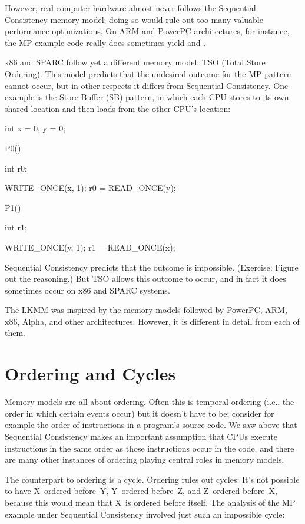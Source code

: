 However, real computer hardware almost never follows the Sequential
Consistency memory model; doing so would rule out too many valuable
performance optimizations.
On ARM and PowerPC architectures, for instance, the MP example code
really does sometimes yield  and .

x86 and SPARC follow yet a different memory model:
TSO (Total Store Ordering).
This model predicts that the undesired outcome for the MP pattern
cannot occur, but in other respects it differs from Sequential
Consistency.
One example is the Store Buffer (SB) pattern, in which each CPU
stores to its own shared location and then loads from the other CPU's
location:

\begin{VerbatimU}
	int x = 0, y = 0;

	P0()
	{
		int r0;

		WRITE_ONCE(x, 1);
		r0 = READ_ONCE(y);
	}

	P1()
	{
		int r1;

		WRITE_ONCE(y, 1);
		r1 = READ_ONCE(x);
	}
\end{VerbatimU}

Sequential Consistency predicts that the outcome  is
impossible.
(Exercise:
Figure out the reasoning.)
But TSO allows this outcome to occur, and in fact it does sometimes
occur on x86 and SPARC systems.

The LKMM was inspired by the memory models followed by PowerPC, ARM,
x86, Alpha, and other architectures.
However, it is different in detail from each of them.


\section{Ordering and Cycles}
\label{sec:docs:explanation:Ordering and Cycles}

Memory models are all about ordering.
Often this is temporal ordering (i.e., the order in which certain
events occur) but it doesn't have to be; consider for example the
order of instructions in a program's source code.
We saw above that Sequential Consistency makes an important assumption
that CPUs execute instructions in the same order as those instructions
occur in the code, and there are many other instances of ordering
playing central roles in memory models.

The counterpart to ordering is a cycle.
Ordering rules out cycles:
It's not possible to have X~ordered before~Y, Y~ordered before~Z, and
Z~ordered before~X, because this would mean that X~is ordered before
itself.
The analysis of the MP example under Sequential Consistency involved
just such an impossible cycle:

